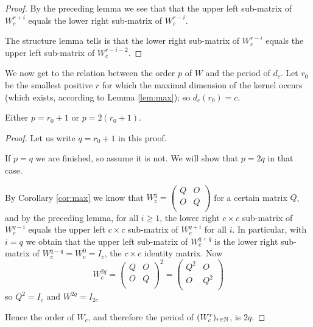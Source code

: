 \begin{proof}
  By the preceding lemma we see that that the upper left sub-matrix of $W_{c}^{r+i}$ equals the lower right sub-matrix of $W_{c}^{r-i}$.

  The structure lemma tells is that the lower right sub-matrix of $W_{c}^{r-i}$ equals the upper left sub-matrix of $W_{c}^{r-i-2}$.
\end{proof}

We now get to the relation between the order $p$ of $W$ and the period of
$d_c$. Let $r_0$ be the smallest positive $r$ for which the maximal
dimension of the kernel occurs (which exists, according to Lemma
\ref{lem:max}); so $d_c(r_0)=c$.
\begin{lemma}\label{lem:half}
  Either $p=r_0+1$ or $p=2(r_0+1)$.
\end{lemma}

\begin{proof}
  Let us write $q=r_0+1$ in this proof.

  If $p=q$ we are finished, so assume it is not. We will show that $p=2q$ in
  that case.

  By Corollary \ref{cor:max} we know that 
  $W_{c}^{q}=\left(\begin{smallmatrix} Q & O \\ O & Q \\\end{smallmatrix}\right)$
  for a certain matrix $Q$, and by the preceding lemma, for all $i\geq 1$,
  the lower right $c\times c$ sub-matrix of
  $W_{c}^{q-i}$ equals the upper left $c\times c$ sub-matrix of $W_{c}^{q+i}$
  for all $i$. In particular, with $i=q$ we obtain that
  the upper left sub-matrix of $W_{c}^{q+q}$ is the lower right sub-matrix of
  $W_{c}^{q-q} = W_{c}^{0} = I_{c}$, the $c\times c$ identity matrix.
  Now
  \[
  W_{c}^{2q}
  =
  \left(
  \begin{array}{cc}
    Q & O \\
    O & Q \\
  \end{array}
  \right)^{2}
  =
  \left(
  \begin{array}{cc}
    Q^{2} & O \\
    O & Q^{2} \\
  \end{array}
  \right)
  \]
  so $Q^{2}=I_{c}$ and $W^{2q}=I_{2c}$
  
  Hence the order of $W_{c}$, and therefore the period of $(W_{c}^{r})_{r\in\mathbb{N}}$, is $2q$.
\end{proof}

